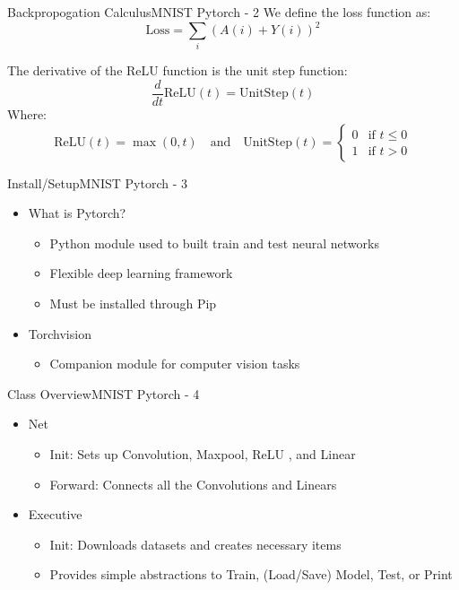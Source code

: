 \documentclass{beamer}
\begin{document}
		\begin{frame}{Backpropogation Calculus}{MNIST Pytorch - 2}
			We define the loss function as: \[ 
				\text{Loss} = \sum_i (A(i) + Y(i))^2 
			\]
			
			The derivative of the ReLU function is the unit step function: \[ 
				\frac{d}{dt} \text{ReLU}(t) = \text{UnitStep}(t) 
			\]
			Where: \[ 
				\text{ReLU}(t) = \max(0, t) 
				\quad \text{and} \quad
				\text{UnitStep}(t) =
				\begin{cases}
					0 & \text{if } t \leq 0 \\
					1 & \text{if } t > 0
				\end{cases}
			\]
		\end{frame}

		\begin{frame}{Install/Setup}{MNIST Pytorch - 3}
			\begin{itemize}
				\item What is Pytorch? 
				\begin{itemize}
					\item Python module used to built train and test neural networks
					\item Flexible deep learning framework
					\item Must be installed through Pip
				\end{itemize}
				
				\item Torchvision 
				\begin{itemize}
					\item Companion module for computer vision tasks
				\end{itemize}
			\end{itemize}
		\end{frame}

		\begin{frame}{Class Overview}{MNIST Pytorch - 4}
			\begin{itemize}
				\item Net
				\begin{itemize}
					\item Init: Sets up Convolution, Maxpool, ReLU , and Linear
					\item Forward: Connects all the Convolutions and Linears 
				\end{itemize}
					
				\item Executive
				\begin{itemize}
					\item Init: Downloads datasets and creates necessary items
					\item Provides simple abstractions to Train, (Load/Save) Model, Test, or Print
				\end{itemize}
			\end{itemize}
		\end{frame}
\end{document}
